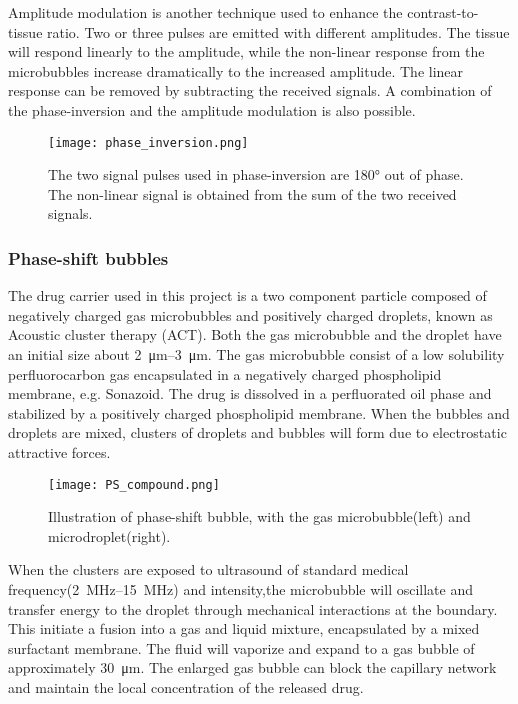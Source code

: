 Amplitude modulation is another technique used to enhance the contrast-to-tissue ratio. Two or three pulses are emitted with different amplitudes. The tissue will respond linearly to the amplitude, while the non-linear response from the microbubbles increase dramatically to the increased amplitude. The linear response can be removed by subtracting the received signals. A combination of the phase-inversion and the amplitude modulation is also possible. 

\begin{figure}[h]
  \centering
  \label{Fig:phase inversion}
  \texttt{[image: phase\_inversion.png]}
  \caption{The two signal pulses used in phase-inversion are \ang{180} out of phase. The non-linear signal is obtained from the sum of the two received signals\cite{Hoskins2010}.}
\end{figure}

\subsubsection{Phase-shift bubbles}
The drug carrier used in this project is a two component particle composed of negatively charged gas microbubbles and positively charged droplets, known as Acoustic cluster therapy (ACT). Both the gas microbubble and the droplet have an initial size about \SIrange{2}{3}{\micro\metre}. The gas microbubble consist of a low solubility perfluorocarbon gas encapsulated in a negatively charged phospholipid membrane, e.g. Sonazoid\texttrademark. The drug is dissolved in a perfluorated oil phase and stabilized by a positively charged phospholipid membrane. When the bubbles and droplets are mixed, clusters of droplets and bubbles will form due to electrostatic attractive forces.


\begin{figure}[h]
  \centering
  \label{Fig:Sonazoid}
  \texttt{[image: PS\_compound.png]}
  \caption{Illustration of phase-shift bubble, with the gas microbubble(left) and microdroplet(right).}
\end{figure}


When the clusters are exposed to ultrasound of standard medical frequency(\SIrange{2}{15}{\mega\hertz}\cite{Hoskins2010}) and intensity,the microbubble will oscillate and transfer energy to the droplet through mechanical interactions at the boundary. This initiate a fusion into a gas and liquid mixture, encapsulated by a mixed surfactant membrane. The fluid will vaporize and expand to a gas bubble of approximately \SI{30}{\micro\metre}. The enlarged gas bubble can block the capillary network and maintain the local concentration of the released drug. 

